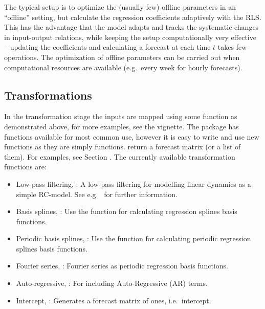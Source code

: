 The typical \onlineforecast setup is to optimize the (usually few) offline
parameters in an ``offline'' setting, but calculate the regression coefficients
adaptively with the RLS. This has the advantage that the model adapts and tracks
the systematic changes in input-output relations, while keeping the setup
computationally very effective -- updating the coefficients and calculating a
forecast at each time $t$ takes few operations. The optimization of
offline parameters can be carried out when computational resources are available
(e.g.\ every week for hourly forecasts).



\subsection{Transformations}\label{sec:transf-stage}

In the transformation stage the inputs are mapped using some function as
demonstrated above, for more examples, see the 
vignette. The \onlineforecast package has functions available for most common
use, however it is easy to write and use new functions as they are simply \Rprog
functions. 
return a forecast matrix (or a list of them). For \add{\Rprog}
examples, see Section . The currently available transformation functions are:

\begin{itemize}
\item Low-pass filtering, : A low-pass filtering for modelling
  linear dynamics as a simple RC-model. See e.g.\ \cite{nielsen2006modelling}
  for further information.
\item Basis splines, : Use the  function for
  calculating regression splines basis functions.
\item Periodic basis splines, : Use the  function
  for calculating periodic regression splines basis functions.
\item Fourier series, : Fourier series as periodic regression basis
  functions.
\item Auto-regressive, : For including Auto-Regressive (AR) terms.
\item Intercept, : Generates a forecast matrix of ones,
  i.e.\ intercept.
\end{itemize}

